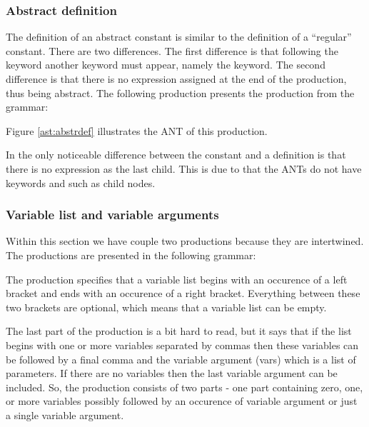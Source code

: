 \subsubsection{Abstract definition}
The definition of an abstract constant is similar to the definition of a
``regular'' constant. There are two differences. The first difference is that
following the  keyword another keyword must appear, namely the
 keyword. The second difference is that there is no expression
assigned at the end of the production, thus being abstract. The following
production presents the production from the grammar:

\begin{ebnf}
\end{ebnf}

Figure \ref{ast:abstrdef} illustrates the ANT of this production.



In  the only noticeable difference between the constant and 
a definition is that there is no expression as the last child.  This is due to
that the ANTs do not have keywords and such as child nodes.

\subsubsection{Variable list and variable arguments}
Within this section we have couple two productions because they are intertwined. 
The productions are presented in the following grammar:

\begin{ebnf}
\end{ebnf}

The production specifies that a variable list begins with an occurence of a left
bracket and ends with an occurence of a right bracket. Everything between these
two brackets are optional, which means that a variable list can be empty.

The last part of the production is a bit hard to read, but it says that if the
list begins with one or more variables separated by commas then these variables
can be followed by a final comma and the variable argument (vars) which is a
list of parameters. If there are no variables then the last variable argument
can be included. So, the production consists of two parts - one part containing
zero, one, or more variables possibly followed by an occurence of variable
argument or just a single variable argument.

